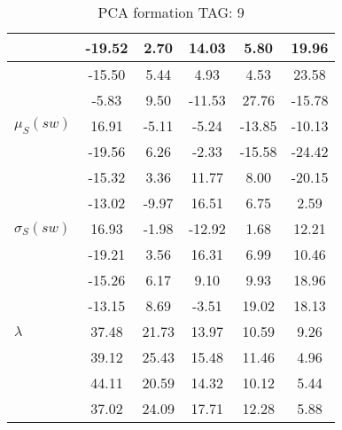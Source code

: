 \begin{table}[h!]
\begin{center}
\begin{tabular}{| l | c | c | c | c | c |}
 & -19.52  & 2.70  & 14.03  & 5.80  & 19.96 \\\hline
 & -15.50  & 5.44  & 4.93  & 4.53  & 23.58 \\\hline
 & -5.83  & 9.50  & -11.53  & 27.76  & -15.78 \\\hline
$\mu_S(sw)$ & 16.91  & -5.11  & -5.24  & -13.85  & -10.13 \\\hline
 & -19.56  & 6.26  & -2.33  & -15.58  & -24.42 \\\hline
 & -15.32  & 3.36  & 11.77  & 8.00  & -20.15 \\\hline
 & -13.02  & -9.97  & 16.51  & 6.75  & 2.59 \\\hline
$\sigma_S(sw)$ & 16.93  & -1.98  & -12.92  & 1.68  & 12.21 \\\hline
 & -19.21  & 3.56  & 16.31  & 6.99  & 10.46 \\\hline
 & -15.26  & 6.17  & 9.10  & 9.93  & 18.96 \\\hline
 & -13.15  & 8.69  & -3.51  & 19.02  & 18.13 \\\hline
$\lambda$ & 37.48  & 21.73  & 13.97  & 10.59  & 9.26 \\\hline
 & 39.12  & 25.43  & 15.48  & 11.46  & 4.96 \\\hline
 & 44.11  & 20.59  & 14.32  & 10.12  & 5.44 \\\hline
 & 37.02  & 24.09  & 17.71  & 12.28  & 5.88 \\\hline
\end{tabular}
\caption{PCA formation TAG: 9}
\end{center}
\end{table}